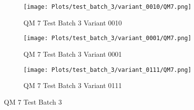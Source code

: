 \documentclass{DissertateFigs}
\begin{document}
\begin{figure}[t!]
\medskip

    \begin{subfigure}{0.47\textwidth}
    \texttt{[image: Plots/test\_batch\_3/variant\_0010/QM7.png]}
    \caption{QM 7 Test Batch 3 Variant 0010}
    \end{subfigure}
    \begin{subfigure}{0.47\textwidth}
    \texttt{[image: Plots/test\_batch\_3/variant\_0001/QM7.png]}
    \caption{QM 7 Test Batch 3 Variant 0001}
    \end{subfigure}

\medskip

    \begin{subfigure}{0.47\textwidth}
    \texttt{[image: Plots/test\_batch\_3/variant\_0111/QM7.png]}
    \caption{QM 7 Test Batch 3 Variant 0111}
    \end{subfigure}
\caption{QM 7 Test Batch 3}
    \end{figure}
\clearpage
\end{document}
